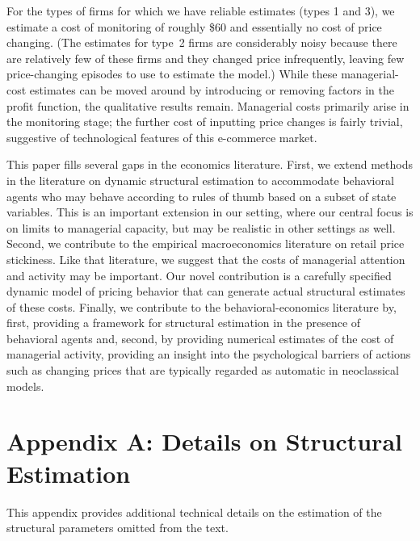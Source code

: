\documentclass[11pt]{article}
\begin{document}
\begin{spacing}{1.3}
For the types of firms for which we have reliable estimates (types 1
and 3), we estimate a cost of monitoring of roughly \$60 and
essentially no cost of price changing. (The estimates for type~2 firms
are considerably noisy because there are relatively few of these firms
and they changed price infrequently, leaving few price-changing
episodes to use to estimate the model.) While these managerial-cost
estimates can be moved around by introducing or removing factors in
the profit function, the qualitative results remain. Managerial costs
primarily arise in the monitoring stage; the further cost of inputting
price changes is fairly trivial, suggestive of technological features
of this e-commerce market.

This paper fills several gaps in the economics literature.  First, we
extend methods in the literature on dynamic structural estimation to
accommodate behavioral agents who may behave according to rules of
thumb based on a subset of state variables. This is an important
extension in our setting, where our central focus is on limits to
managerial capacity, but may be realistic in other settings as
well. Second, we contribute to the empirical macroeconomics literature
on retail price stickiness. Like that literature, we suggest that the
costs of managerial attention and activity may be important.  Our
novel contribution is a carefully specified dynamic model of pricing
behavior that can generate actual structural estimates of these costs.
Finally, we contribute to the behavioral-economics literature by,
first, providing a framework for structural estimation in the presence
of behavioral agents and, second, by providing numerical estimates of
the cost of managerial activity, providing an insight into the
psychological barriers of actions such as changing prices that are
typically regarded as automatic in neoclassical models.

\clearpage

\end{spacing}

\setcounter{equation}{0}
\renewcommand{\theequation}{A\arabic{equation}}

\section*{Appendix A: Details on Structural Estimation}

This appendix provides additional technical details on the estimation
of the structural parameters omitted from the text.
\end{document}

